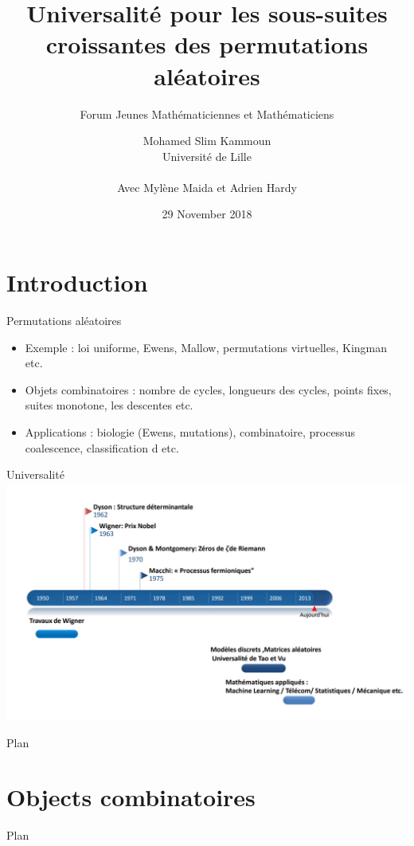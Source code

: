 \documentclass[french]{beamer}
\title{Universalité pour les sous-suites croissantes des permutations aléatoires}
\subtitle {Forum Jeunes Mathématiciennes et Mathématiciens}
\author 
{ \large{Mohamed Slim Kammoun}
\\ Université de Lille \\ \ \\ \large{Avec Mylène Maida  et Adrien Hardy}}
\date { 29 November 2018}
\begin{document}
\begin{frame}
  \titlepage  
\end{frame}



\section*{Introduction}
\begin{frame}{Permutations aléatoires}
\begin{itemize}
    \item Exemple : loi uniforme, Ewens, Mallow, permutations virtuelles, Kingman etc.
    \item Objets combinatoires : nombre de cycles, longueurs des cycles, points fixes, suites monotone, les descentes etc.
    \item Applications : biologie (Ewens, mutations), combinatoire, processus coalescence, classification d etc. 
\end{itemize}
\end{frame}


\begin{frame}{Universalité}
  \includegraphics[scale=0.4]{Capture}
\end{frame}
\begin{frame}{Plan}
     \tableofcontents[
    hideothersubsections, 
    sectionstyle=show,
]
\end{frame}



\section{Objects combinatoires}
\begin{frame}{Plan}
\tableofcontents[currentsection,currentsubsection,
    hideothersubsections, 
    sectionstyle=show/shaded,
]
\end{frame}
\end{document}
